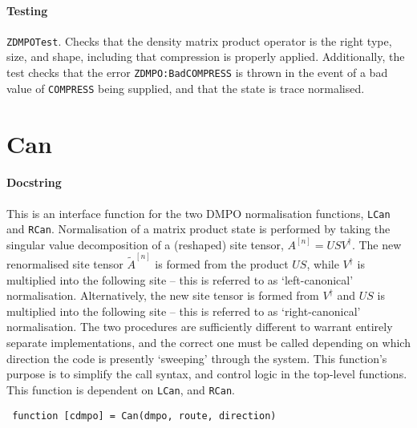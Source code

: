  \paragraph{Testing} \lstinline$ZDMPOTest$. Checks that the density matrix product operator is the right type, size, and shape, including that compression is properly applied. Additionally, the test checks that the error \lstinline$ZDMPO:BadCOMPRESS$ is thrown in the event of a bad value of \lstinline$COMPRESS$ being supplied, and that the state is trace normalised.

 \section{Can}
 \paragraph{Docstring} This is an interface function for the two DMPO normalisation functions, \lstinline$LCan$ and \lstinline$RCan$. Normalisation of a matrix product state is performed by taking the singular value decomposition of a (reshaped) site tensor, \(A^{[n]} = USV^{\dagger}\). The new renormalised site tensor \(\tilde{A}^{[n]}\) is formed from the product \(US\), while \(V^{\dagger}\) is multiplied into the following site -- this is referred to as `left-canonical' normalisation. Alternatively, the new site tensor is formed from \(V^{\dagger}\) and \(US\) is multiplied into the following site -- this is referred to as `right-canonical' normalisation. The two procedures are sufficiently different to warrant entirely separate implementations, and the correct one must be called depending on which direction the code is presently `sweeping' through the system. This function's purpose is to simplify the call syntax, and control logic in the top-level functions. This function is dependent on \lstinline$LCan$, and \lstinline$RCan$.
 \begin{lstlisting}
 function [cdmpo] = Can(dmpo, route, direction) \end{lstlisting}
